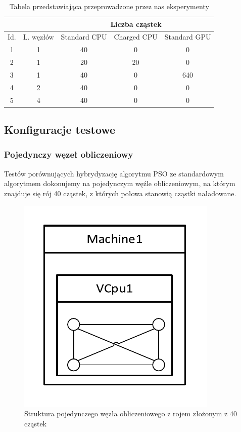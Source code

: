 \documentclass[12pt, twoside, openany, abstract=on]{report}
\theoremstyle{definition}
\begin{document}
\begin{table}[t]
\caption{Tabela przedstawiająca przeprowadzone przez nas eksperymenty}
\label{Zestawienie testów}
\setlength{\tabcolsep}{15pt}
\begin{tabular}{c c|c|c|c|}
  \cline{3-5}
  & & \multicolumn{3}{|c|}{Liczba cząstek}  \\
  \hline
   \multicolumn{1}{|c|}{Id.} & L. węzłów & Standard CPU & Charged CPU & Standard GPU \\ 
  \hline
  	\multicolumn{1}{|c|}{1} & 1 & 40 & 0 & 0 \\
  \hline
    \multicolumn{1}{|c|}{2} & 1 & 20 & 20 & 0 \\
  \hline
    \multicolumn{1}{|c|}{3} & 1 & 40 & 0 & 640 \\
  \hline
    \multicolumn{1}{|c|}{4} & 2 & 40 & 0 & 0 \\
  \hline
    \multicolumn{1}{|c|}{5} & 4 & 40 & 0 & 0 \\
  \hline
\end{tabular} 
\end{table}
\subsection{Konfiguracje testowe}


\subsubsection{Pojedynczy węzeł obliczeniowy}
Testów porównujących hybrydyzację algorytmu PSO ze standardowym algorytmem dokonujemy na pojedynczym węźle obliczeniowym, na którym znajduje się rój 40 cząstek, z których połowa stanowią cząstki naładowane.

\begin{figure}[H]
    \centering
    \includegraphics[scale=1]{klasterBbobNoGPU1Node.pdf} 
 \caption{Struktura pojedynczego węzła obliczeniowego z rojem złożonym z 40 cząstek}
\end{figure}
\end{document}

